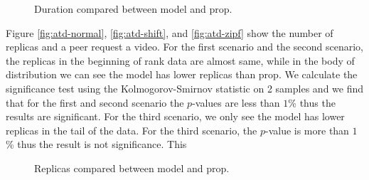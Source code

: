 \documentclass[10pt,final,journal,a4paper]{IEEEtran}
\begin{document}
\begin{figure}[!t]
\centering
{}
\hfill
{}
\hfill
{}
\vspace{2mm}
\caption{Duration compared between model and prop.}
\label{fig:duration}
\end{figure}


Figure \ref{fig:atd-normal}, \ref{fig:atd-shift}, and \ref{fig:atd-zipf} show the number of replicas and a peer request a video. 
For the first scenario and the second scenario, the replicas in the beginning of rank data are almost same, while in the body of distribution we can see the model has lower replicas than prop. 
We calculate the significance test using the Kolmogorov-Smirnov statistic on 2 samples and we find that for the first and second scenario the $p$-values are less than $1$\% thus the results are significant. 
For the third scenario, we only see the model has lower replicas in the tail of the data.
For the third scenario, the $p$-value is more than $1$\% thus the result is not significance.    
This 
\begin{figure}[!t]
\centering
{}
\hfill
{}
\hfill
{}
\vspace{2mm}
\caption{Replicas compared between model and prop.}
\label{fig:replica}
\end{figure}
\end{document}
